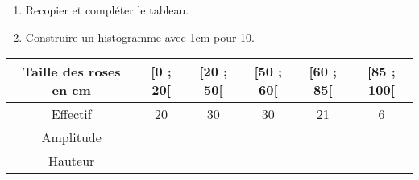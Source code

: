 \begin{enumerate}
\item Recopier et compléter le tableau.
\item Construire un histogramme avec 1cm pour 10.
\end{enumerate}


\begin{tabular}{|c|c|c|c|c|c|}
\hline 
Taille des roses en cm & [0 ; 20[& [20 ; 50[& [50 ; 60[& [60 ; 85[& [85 ; 100[\\
\hline 
Effectif &20& 30 &30&21 &6\\
\hline 
Amplitude &  &   & &  &\\
\hline 
Hauteur &&  &&  &\\
\hline 
\end{tabular} 


